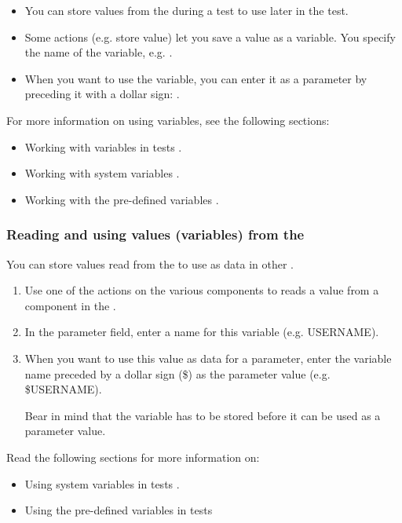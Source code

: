 
\begin{itemize}
\item You can store values from the \gdaut{} during a test to use later in the test.
\item Some actions (e.g. store value) let you save a value as a variable. You specify the name of the variable, e.g. . 
\item When you want to use the variable, you can enter it as a parameter by preceding it with a dollar sign: . 
\end{itemize}
For more information on using variables, see the following sections:
\begin{itemize}
\item Working with variables in tests .
\item Working with system variables .
\item Working with the  pre-defined variables .
\end{itemize}

\subsubsection{Reading and using values (variables) from the \gdaut{}}
\label{TasksAUTVariables}

You can store values read from the \gdaut{} to use as data in other \gdcases{}. 

\begin{enumerate}
\item Use one of  the  actions on the various components to  reads a value from a component in the \gdaut{}. 

\item In the parameter field, enter a name for this variable (e.g. USERNAME). 

\item When you want to use this value as data for a parameter, enter the variable name preceded by a dollar sign (\$) as the parameter value (e.g. \$USERNAME).

Bear in mind that the variable has to be stored before it can be used as a parameter value.  

\end{enumerate}
Read the following sections for more information on:
\begin{itemize}
\item Using system variables in tests . 
\item Using the pre-defined  variables in tests 
\end{itemize}


